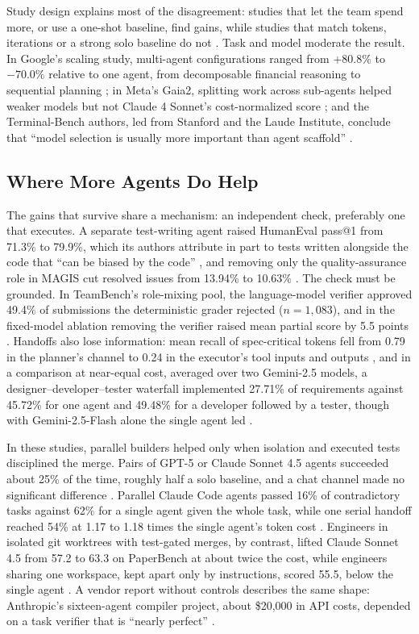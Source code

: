 Study design explains most of the disagreement: studies that let the team spend more, or use a one-shot baseline, find gains, while studies that match tokens, iterations or a strong solo baseline do not \citep[see also][]{A10}. Task and model moderate the result. In Google's scaling study, multi-agent configurations ranged from +80.8\% to $-70.0\%$ relative to one agent, from decomposable financial reasoning to sequential planning \citep{H11}; in Meta's Gaia2, splitting work across sub-agents helped weaker models but not Claude 4 Sonnet's cost-normalized score \citep{A26}; and the Terminal-Bench authors, led from Stanford and the Laude Institute, conclude that ``model selection is usually more important than agent scaffold'' \citep{C18}.

\subsection{Where More Agents Do Help}

The gains that survive share a mechanism: an independent check, preferably one that executes. A separate test-writing agent raised HumanEval pass@1 from 71.3\% to 79.9\%, which its authors attribute in part to tests written alongside the code that ``can be biased by the code'' \citep{T4}, and removing only the quality-assurance role in MAGIS cut resolved issues from 13.94\% to 10.63\% \citep{T6}. The check must be grounded. In TeamBench's role-mixing pool, the language-model verifier approved 49.4\% of submissions the deterministic grader rejected ($n = 1{,}083$), and in the fixed-model ablation removing the verifier raised mean partial score by 5.5 points \citep{T18}. Handoffs also lose information: mean recall of spec-critical tokens fell from 0.79 in the planner's channel to 0.24 in the executor's tool inputs and outputs \citep{T18}, and in a comparison at near-equal cost, averaged over two Gemini-2.5 models, a designer--developer--tester waterfall implemented 27.71\% of requirements against 45.72\% for one agent and 49.48\% for a developer followed by a tester, though with Gemini-2.5-Flash alone the single agent led \citep{T12}.

In these studies, parallel builders helped only when isolation and executed tests disciplined the merge. Pairs of GPT-5 or Claude Sonnet 4.5 agents succeeded about 25\% of the time, roughly half a solo baseline, and a chat channel made no significant difference \citep{T19}. Parallel Claude Code agents passed 16\% of contradictory tasks against 62\% for a single agent given the whole task, while one serial handoff reached 54\% at 1.17 to 1.18 times the single agent's token cost \citep{T22}. Engineers in isolated git worktrees with test-gated merges, by contrast, lifted Claude Sonnet 4.5 from 57.2 to 63.3 on PaperBench at about twice the cost, while engineers sharing one workspace, kept apart only by instructions, scored 55.5, below the single agent \citep{T20}. A vendor report without controls describes the same shape: Anthropic's sixteen-agent compiler project, about \$20,000 in API costs, depended on a task verifier that is ``nearly perfect'' \citep{T16}.

